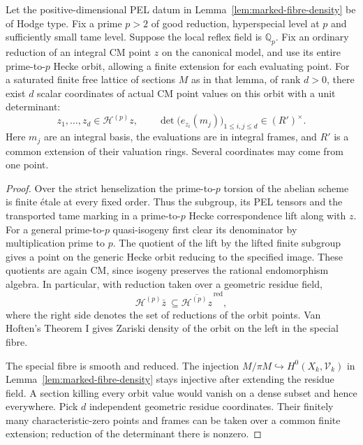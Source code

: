 \begin{auxlemma}\label{lem:ordinary-hecke-evaluations}
Let the positive-dimensional PEL datum in
Lemma~\ref{lem:marked-fibre-density} be of Hodge type. Fix a prime
\(p>2\) of good reduction, hyperspecial level at \(p\) and
sufficiently small tame level. Suppose the local reflex field is
\(\mathbb Q_p\). Fix an ordinary reduction of an integral CM point
\(z\) on the canonical model, and use its entire prime-to-\(p\)
Hecke orbit, allowing a finite extension for each evaluating point.
For a saturated finite free lattice of sections \(M\) as in that
lemma, of rank \(d>0\), there exist \(d\) scalar coordinates of
actual CM point values on this orbit with a unit determinant:
\[
     z_1,\ldots,z_d\in\mathcal H^{(p)}z,\qquad
       \det\big(e_{z_i}(m_j)\big)_{1\le i,j\le d}\in (R')^\times .
\]
Here \(m_j\) are an integral basis, the evaluations are in integral
frames, and \(R'\) is a common extension of their valuation rings.
Several coordinates may come from one point.
\end{auxlemma}
\begin{proof}
Over the strict henselization the prime-to-\(p\) torsion of the
abelian scheme is finite \'etale at every fixed order. Thus the
subgroup, its PEL tensors and the transported tame marking in a
prime-to-\(p\) Hecke correspondence lift along with \(z\). For
a general prime-to-\(p\) quasi-isogeny first clear its denominator
by multiplication prime to \(p\). The quotient of the lift by the
lifted finite subgroup gives a point on the generic Hecke orbit
reducing to the specified image. These quotients are again CM,
since isogeny preserves the rational endomorphism algebra. In
particular, with reduction taken over a geometric residue field,
\[
      \mathcal H^{(p)}\bar z\ \subseteq               \overline{\mathcal H^{(p)}z}^{\,\mathrm{red}},
\]
where the right side denotes the set of reductions of the orbit points.
Van Hoften's Theorem I gives Zariski density of the orbit on the
left in the special fibre. \cite[Theorem I]{van-hoften-ordinary}

The special fibre is smooth and reduced. The injection
\(M/\pi M\hookrightarrow H^0(X_k,\mathcal V_k)\) in
Lemma~\ref{lem:marked-fibre-density} stays injective after
extending the residue field. A section killing every orbit value
would vanish on a dense subset and hence everywhere. Pick \(d\)
independent geometric residue coordinates. Their finitely many
characteristic-zero points and frames can be taken over a common
finite extension; reduction of the determinant there is nonzero.
\end{proof}

